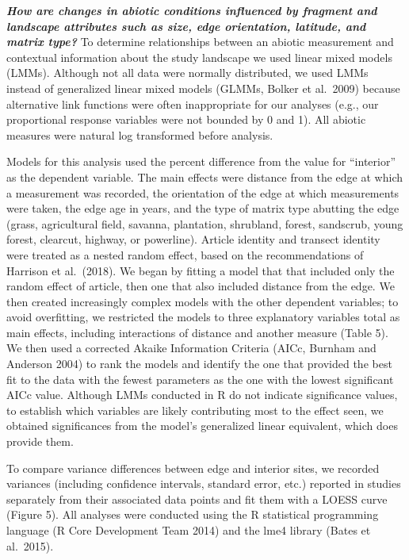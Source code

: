 \documentclass[
  man]{apa6}
\begin{document}
\textbf{\emph{How are changes in abiotic conditions influenced by fragment and landscape attributes such as size, edge orientation, latitude, and matrix type?}} To determine relationships between an abiotic measurement and contextual information about the study landscape we used linear mixed models (LMMs). Although not all data were normally distributed, we used LMMs instead of generalized linear mixed models (GLMMs, Bolker et al.~2009) because alternative link functions were often inappropriate for our analyses (e.g., our proportional response variables were not bounded by 0 and 1). All abiotic measures were natural log transformed before analysis.

Models for this analysis used the percent difference from the value for ``interior'' as the dependent variable. The main effects were distance from the edge at which a measurement was recorded, the orientation of the edge at which measurements were taken, the edge age in years, and the type of matrix type abutting the edge (grass, agricultural field, savanna, plantation, shrubland, forest, sandscrub, young forest, clearcut, highway, or powerline). Article identity and transect identity were treated as a nested random effect, based on the recommendations of Harrison et al.~(2018). We began by fitting a model that that included only the random effect of article, then one that also included distance from the edge. We then created increasingly complex models with the other dependent variables; to avoid overfitting, we restricted the models to three explanatory variables total as main effects, including interactions of distance and another measure (Table 5). We then used a corrected Akaike Information Criteria (AICc, Burnham and Anderson 2004) to rank the models and identify the one that provided the best fit to the data with the fewest parameters as the one with the lowest significant AICc value. Although LMMs conducted in R do not indicate significance values, to establish which variables are likely contributing most to the effect seen, we obtained significances from the model's generalized linear equivalent, which does provide them.

To compare variance differences between edge and interior sites, we recorded variances (including confidence intervals, standard error, etc.) reported in studies separately from their associated data points and fit them with a LOESS curve (Figure 5). All analyses were conducted using the R statistical programming language (R Core Development Team 2014) and the lme4 library (Bates et al.~2015).
\end{document}

